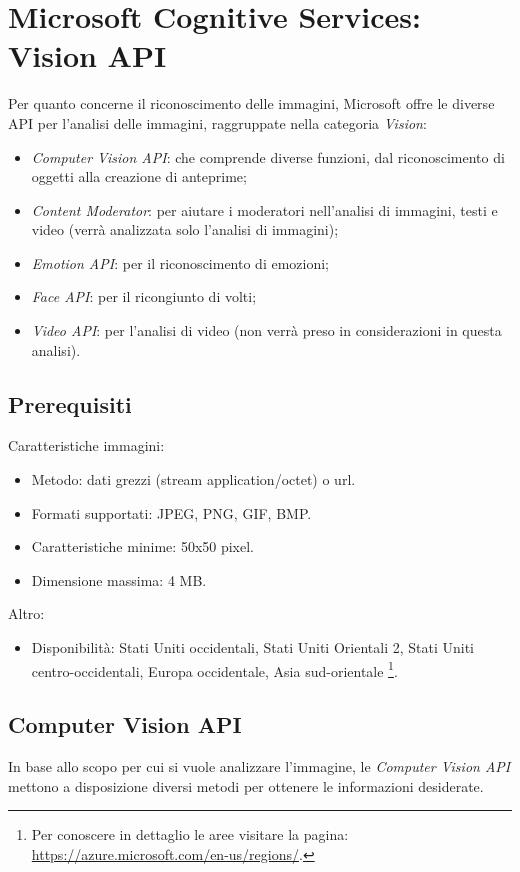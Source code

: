 \section{Microsoft Cognitive Services: Vision API}
Per quanto concerne il riconoscimento delle immagini, Microsoft offre le diverse API per l'analisi delle immagini, raggruppate nella categoria \textit{Vision}:
\begin{itemize}
\item \textit{Computer Vision API}: che comprende diverse funzioni, dal riconoscimento di oggetti alla creazione di anteprime;
\item \textit{Content Moderator}: per aiutare i moderatori nell'analisi di immagini, testi e video (verrà analizzata solo l'analisi di immagini);
\item \textit{Emotion API}: per il riconoscimento di emozioni;
\item \textit{Face API}: per il ricongiunto di volti;
\item \textit{Video API}: per l'analisi di video (non verrà preso in considerazioni in questa analisi).
\end{itemize}
%
\subsection{Prerequisiti}
Caratteristiche immagini:
\begin{itemize}
\item Metodo: dati grezzi (stream application/octet) o url.
\item Formati supportati: JPEG, PNG, GIF, BMP.
\item Caratteristiche minime: 50x50 pixel. 
\item Dimensione massima: 4 MB.
\end{itemize}
Altro:
\begin{itemize}
\item Disponibilità: Stati Uniti occidentali, Stati Uniti Orientali 2, Stati Uniti centro-occidentali, Europa occidentale, Asia sud-orientale
\footnote{Per conoscere in dettaglio le aree visitare la pagina: \url{https://azure.microsoft.com/en-us/regions/}.}.
\end{itemize}
%
\subsection{Computer Vision API}
In base allo scopo per cui si vuole analizzare l'immagine, le \textit{Computer Vision API} \cite{microsoft-api} mettono a disposizione diversi metodi per ottenere le informazioni desiderate.

